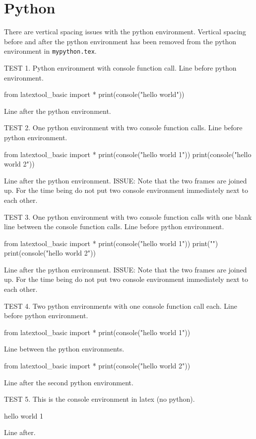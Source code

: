 \section{Python}

There are vertical spacing issues with the python environment.
Vertical spacing before and after the python environment has been removed
from the python environment in \verb!mypython.tex!.

TEST 1.
Python environment with console function call.
Line before python environment.
\begin{python}
from latextool_basic import *
print(console("hello world"))
\end{python}
Line after the python environment.

TEST 2.
One python environment with two console function calls.
Line before python environment.
\begin{python}
from latextool_basic import *
print(console("hello world 1"))
print(console("hello world 2"))
\end{python}
Line after the python environment.
ISSUE: Note that the two frames are joined up.
For the time being do not put two console environment 
immediately next to each other.

\newpage

TEST 3.
One python environment with two console function calls with
one blank line between the console function calls.
Line before python environment.
\begin{python}
from latextool_basic import *
print(console("hello world 1"))
print("")
print(console("hello world 2"))
\end{python}
Line after the python environment.
ISSUE: Note that the two frames are joined up.
For the time being do not put two console environment 
immediately next to each other.

TEST 4.
Two python environments with one console function call each.
Line before python environment.
\begin{python}
from latextool_basic import *
print(console("hello world 1"))
\end{python}
Line between the python environments.
\begin{python}
from latextool_basic import *
print(console("hello world 2"))
\end{python}
Line after the second python environment.

TEST 5. This is the console environment in latex (no python).
\begin{console}
hello world 1
\end{console}
Line after.


